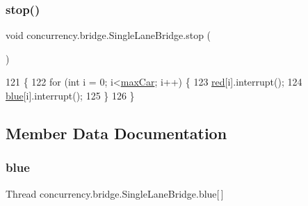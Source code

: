 \mbox{\label{classconcurrency_1_1bridge_1_1_single_lane_bridge_a51eb161521f0daea82f254d3eac1b3bd}} 
\subsubsection{\texorpdfstring{stop()}{stop()}}
{\footnotesize\ttfamily void concurrency.\+bridge.\+Single\+Lane\+Bridge.\+stop (\begin{DoxyParamCaption}{ }\end{DoxyParamCaption})\hspace{0.3cm}{\ttfamily [inline]}}


\begin{DoxyCode}
121                        \{
122         \textcolor{keywordflow}{for} (\textcolor{keywordtype}{int} i = 0; i<\mbox{\hyperlink{classconcurrency_1_1bridge_1_1_single_lane_bridge_ae8bd96d4cf6d5d7b71ad0acbe1bba3df}{maxCar}}; i++) \{
123             \mbox{\hyperlink{classconcurrency_1_1bridge_1_1_single_lane_bridge_a17e1de5011188dd8038e1960b5679f36}{red}}[i].interrupt();
124             \mbox{\hyperlink{classconcurrency_1_1bridge_1_1_single_lane_bridge_ad315140555d509cea539e61ae896a16d}{blue}}[i].interrupt();
125         \}
126     \}
\end{DoxyCode}


\subsection{Member Data Documentation}
\mbox{\label{classconcurrency_1_1bridge_1_1_single_lane_bridge_ad315140555d509cea539e61ae896a16d}} 
\subsubsection{\texorpdfstring{blue}{blue}}
{\footnotesize\ttfamily Thread concurrency.\+bridge.\+Single\+Lane\+Bridge.\+blue\mbox{[}$\,$\mbox{]}\hspace{0.3cm}{\ttfamily [package]}}

